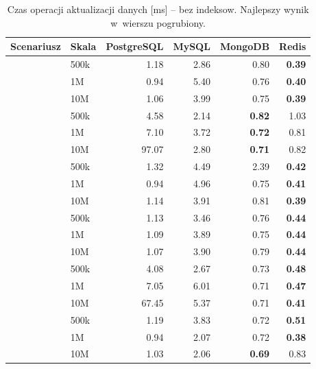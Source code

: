 \begin{table}[H]
\centering
\caption{Czas operacji aktualizacji danych [ms] -- bez indeksow. Najlepszy wynik w~wierszu pogrubiony.}
\label{tab:update_no}
\small
\begin{tabular}{@{}llrrrr@{}}
\toprule
\textbf{Scenariusz} & \textbf{Skala} & \textbf{PostgreSQL} & \textbf{MySQL} & \textbf{MongoDB} & \textbf{Redis} \\
\midrule
{}
 & 500k & 1.18 & 2.86 & 0.80 & \textbf{0.39} \\
 & 1M & 0.94 & 5.40 & 0.76 & \textbf{0.40} \\
 & 10M & 1.06 & 3.99 & 0.75 & \textbf{0.39} \\
\midrule
{}
 & 500k & 4.58 & 2.14 & \textbf{0.82} & 1.03 \\
 & 1M & 7.10 & 3.72 & \textbf{0.72} & 0.81 \\
 & 10M & 97.07 & 2.80 & \textbf{0.71} & 0.82 \\
\midrule
{}
 & 500k & 1.32 & 4.49 & 2.39 & \textbf{0.42} \\
 & 1M & 0.94 & 4.96 & 0.75 & \textbf{0.41} \\
 & 10M & 1.14 & 3.91 & 0.81 & \textbf{0.39} \\
\midrule
{}
 & 500k & 1.13 & 3.46 & 0.76 & \textbf{0.44} \\
 & 1M & 1.09 & 3.89 & 0.75 & \textbf{0.44} \\
 & 10M & 1.07 & 3.90 & 0.79 & \textbf{0.44} \\
\midrule
{}
 & 500k & 4.08 & 2.67 & 0.73 & \textbf{0.48} \\
 & 1M & 7.05 & 6.01 & 0.71 & \textbf{0.47} \\
 & 10M & 67.45 & 5.37 & 0.71 & \textbf{0.41} \\
\midrule
{}
 & 500k & 1.19 & 3.83 & 0.72 & \textbf{0.51} \\
 & 1M & 0.94 & 2.07 & 0.72 & \textbf{0.38} \\
 & 10M & 1.03 & 2.06 & \textbf{0.69} & 0.83 \\
\bottomrule
\end{tabular}
\end{table}
